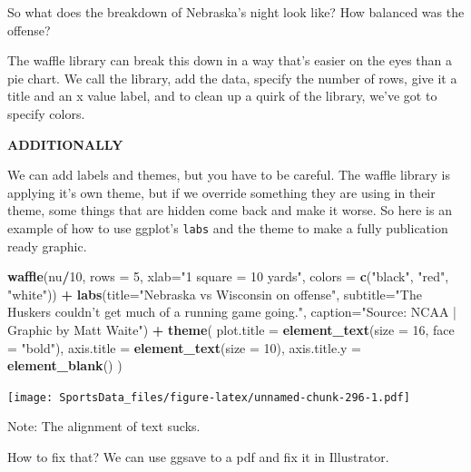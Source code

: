 \documentclass[
]{book}
\newenvironment{Shaded}{\begin{snugshade}}{\end{snugshade}}
\newcommand{\DataTypeTok}[1]{\textcolor[rgb]{0.13,0.29,0.53}{#1}}
\newcommand{\DecValTok}[1]{\textcolor[rgb]{0.00,0.00,0.81}{#1}}
\newcommand{\KeywordTok}[1]{\textcolor[rgb]{0.13,0.29,0.53}{\textbf{#1}}}
\newcommand{\NormalTok}[1]{#1}
\newcommand{\OperatorTok}[1]{\textcolor[rgb]{0.81,0.36,0.00}{\textbf{#1}}}
\newcommand{\StringTok}[1]{\textcolor[rgb]{0.31,0.60,0.02}{#1}}
\begin{document}
So what does the breakdown of Nebraska's night look like? How balanced was the offense?

The waffle library can break this down in a way that's easier on the eyes than a pie chart. We call the library, add the data, specify the number of rows, give it a title and an x value label, and to clean up a quirk of the library, we've got to specify colors.

\textbf{ADDITIONALLY}

We can add labels and themes, but you have to be careful. The waffle library is applying it's own theme, but if we override something they are using in their theme, some things that are hidden come back and make it worse. So here is an example of how to use ggplot's \texttt{labs} and the theme to make a fully publication ready graphic.

\begin{Shaded}
\begin{Highlighting}[]
\KeywordTok{waffle}\NormalTok{(nu}\OperatorTok{/}\DecValTok{10}\NormalTok{, }\DataTypeTok{rows =} \DecValTok{5}\NormalTok{, }\DataTypeTok{xlab=}\StringTok{"1 square = 10 yards"}\NormalTok{, }\DataTypeTok{colors =} \KeywordTok{c}\NormalTok{(}\StringTok{"black"}\NormalTok{, }\StringTok{"red"}\NormalTok{, }\StringTok{"white"}\NormalTok{)) }\OperatorTok{+}\StringTok{ }\KeywordTok{labs}\NormalTok{(}\DataTypeTok{title=}\StringTok{"Nebraska vs Wisconsin on offense"}\NormalTok{, }\DataTypeTok{subtitle=}\StringTok{"The Huskers couldn't get much of a running game going."}\NormalTok{, }\DataTypeTok{caption=}\StringTok{"Source: NCAA | Graphic by Matt Waite"}\NormalTok{) }\OperatorTok{+}\StringTok{ }
\StringTok{  }\KeywordTok{theme}\NormalTok{(}
    \DataTypeTok{plot.title =} \KeywordTok{element_text}\NormalTok{(}\DataTypeTok{size =} \DecValTok{16}\NormalTok{, }\DataTypeTok{face =} \StringTok{"bold"}\NormalTok{),}
    \DataTypeTok{axis.title =} \KeywordTok{element_text}\NormalTok{(}\DataTypeTok{size =} \DecValTok{10}\NormalTok{),}
    \DataTypeTok{axis.title.y =} \KeywordTok{element_blank}\NormalTok{()}
\NormalTok{  )}
\end{Highlighting}
\end{Shaded}

\texttt{[image: SportsData\_files/figure-latex/unnamed-chunk-296-1.pdf]}

Note: The alignment of text sucks.

How to fix that? We can use ggsave to a pdf and fix it in Illustrator.
\end{document}
